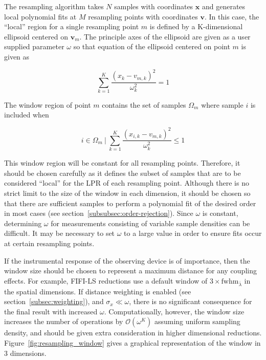 The resampling algorithm takes $N$ samples with coordinates $\bm{x}$ and
generates local polynomial fits at $M$ resampling points with coordinates
$\bm{v}$.
In this case, the ``local'' region for a single resampling point $m$ is defined
by a K-dimensional ellipsoid centered on $\bm{v}_m$.
The principle axes of the ellipsoid are given as a user supplied parameter
$\omega$ so that equation of the ellipsoid centered on point $m$ is given as

\begin{equation}
    \sum_{k=1}^{K}{\frac{(x_k - v_{m, k})^2}{\omega_k^2}} = 1
    \label{eq:equation11}
\end{equation}

The window region of point $m$ contains the set of samples $\Omega_m$ where sample
$i$ is included when

\begin{equation}
    i \in \Omega_m ~ \vert ~
        \sum_{k=1}^{K}{\frac{(x_{i, k} - v_{m, k})^2}{\omega_k^2}} \leq 1
    \label{eq:equation12}
\end{equation}

This window region will be constant for all resampling points.
Therefore, it should be chosen carefully as it defines the subset of samples
that are to be considered ``local'' for the LPR of each resampling point.
Although there is no strict limit to the size of the window in each dimension,
it should be chosen so that there are sufficient samples to perform a
polynomial fit of the desired order in most cases (see
section~\ref{subsubsec:order-rejection}).
Since $\omega$ is constant, determining $\omega$ for measurements consisting of
variable sample densities can be difficult.
It may be necessary to set $\omega$ to a large value in order to ensure fits occur
at certain resampling points.

If the instrumental response of the observing device is of importance, then
the window size should be chosen to represent a maximum distance for any
coupling effects.
For example, FIFI-LS reductions use a default window of
$3 \times \text{fwhm}_{\bar{\lambda}}$ in the spatial dimensions.
If distance weighting is enabled (see section~\ref{subsec:weighting}), and
$\sigma_x \ll \omega$, there is no significant consequence for the final result
with increased $\omega$.
Computationally, however, the window size increases the number of operations by
$\mathcal{O}(\omega^{K})$ assuming uniform sampling density, and should be
given extra consideration in higher dimensional reductions.
Figure~\ref{fig:resampling_window} gives a graphical representation of the
window in 3 dimensions.

